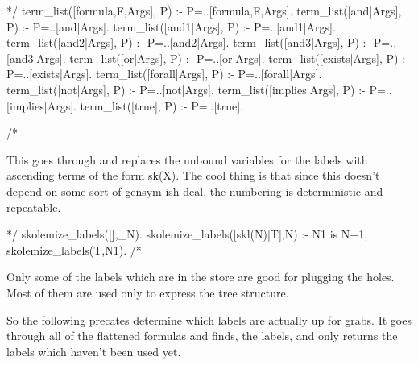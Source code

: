 \documentclass{book}[9pt]
\newenvironment{code}%
{\small \verbatim}%
{\endverbatim \large}
\begin{document}
\begin{code}
*/
term_list([formula,F,Args], P)  :-  P=..[formula,F,Args].
term_list([and|Args], P)        :-  P=..[and|Args].
term_list([and1|Args], P)       :-  P=..[and1|Args].
term_list([and2|Args], P)       :-  P=..[and2|Args].
term_list([and3|Args], P)       :-  P=..[and3|Args].
term_list([or|Args], P)         :-  P=..[or|Args].
term_list([exists|Args], P)     :-  P=..[exists|Args].
term_list([forall|Args], P)     :-  P=..[forall|Args].
term_list([not|Args], P)        :-  P=..[not|Args].
term_list([implies|Args], P)    :-  P=..[implies|Args].
term_list([true], P)            :-  P=..[true].

/*
\end{code}

This goes through and replaces the unbound variables for the labels
with ascending terms of the form sk(X).  The cool thing is that since
this doesn't depend on some sort of gensym-ish deal, the numbering is
deterministic and repeatable.

\begin{code}
*/
skolemize_labels([],_N).
skolemize_labels([skl(N)|T],N) :-
        N1 is N+1,
        skolemize_labels(T,N1).
/*
\end{code}

Only some of the labels which are in the store are good for plugging
the holes.  Most of them are used only to express the tree structure.

So the following precates determine which labels are actually up for
grabs.  It goes through all of the flattened formulas and finds, the
labels, and only returns the labels which haven't been used yet.
\end{document}
